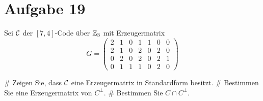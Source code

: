 \section*{Aufgabe 19}
Sei $\mathcal{C}$ der $[7,4]$-Code über $\mathbb{Z}_3$ mit Erzeugermatrix
\begin{equation*}
	G =
	\begin{pmatrix}
	2 & 1 & 0 & 1 & 1 & 0 & 0 \\
	2 & 1 & 0 & 2 & 0 & 2 & 0 \\
	0 & 2 & 0 & 2 & 0 & 2 & 1 \\
	0 & 1 & 1 & 1 & 0 & 2 & 0
	\end{pmatrix}
\end{equation*}
\begin{myList}
#
Zeigen Sie, dass $\mathcal{C}$ eine Erzeugermatrix in Standardform besitzt.
#
Bestimmen Sie eine Erzeugermatrix von $C^\bot$.
#
Bestimmen Sie $C \cap C^\bot$.
\end{myList}
